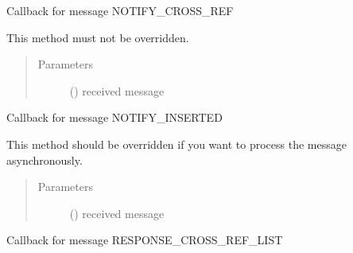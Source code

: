 \documentclass[letterpaper,10pt,english]{sphinxmanual}
\begin{document}
\begin{fulllineitems}
\begin{fulllineitems}
\begin{quote}
\begin{description}
\end{description}\end{quote}

\end{fulllineitems}


\begin{fulllineitems}
\label{\detokenize{bbc1.core.bbc_app:bbc1.core.bbc_app.Callback.proc_notify_cross_ref}}
Callback for message NOTIFY\_CROSS\_REF

This method must not be overridden.
\begin{quote}\begin{description}
\item[{Parameters}] \leavevmode
{} () \textendash{} received message

\end{description}\end{quote}

\end{fulllineitems}


\begin{fulllineitems}
\label{\detokenize{bbc1.core.bbc_app:bbc1.core.bbc_app.Callback.proc_notify_inserted}}
Callback for message NOTIFY\_INSERTED

This method should be overridden if you want to process the message asynchronously.
\begin{quote}\begin{description}
\item[{Parameters}] \leavevmode
{} () \textendash{} received message

\end{description}\end{quote}

\end{fulllineitems}


\begin{fulllineitems}
\label{\detokenize{bbc1.core.bbc_app:bbc1.core.bbc_app.Callback.proc_resp_cross_ref_list}}
Callback for message RESPONSE\_CROSS\_REF\_LIST


\end{fulllineitems}
\end{fulllineitems}
\end{document}
